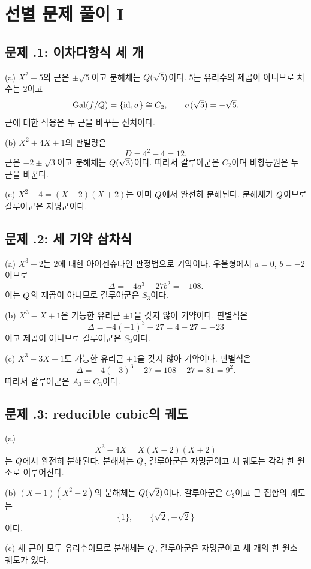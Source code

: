 \section{선별 문제 풀이 I}
\label{sec:equation-groups-solutions-a}

\subsection*{문제 \thechapter.1: 이차다항식 세 개}

\begin{solution}
(a) $X^2-5$의 근은 $\pm\sqrt5$이고 분해체는 $Q(\sqrt5)$이다. $5$는 유리수의 제곱이 아니므로 차수는 $2$이고
\[
  \operatorname{Gal}(f/Q)=\{\operatorname{id},\sigma\}\cong C_2,
  \qquad
  \sigma(\sqrt5)=-\sqrt5.
\]
근에 대한 작용은 두 근을 바꾸는 전치이다.

(b) $X^2+4X+1$의 판별량은
\[
  D=4^2-4=12.
\]
근은 $-2\pm\sqrt3$이고 분해체는 $Q(\sqrt3)$이다. 따라서 갈루아군은 $C_2$이며 비항등원은 두 근을 바꾼다.

(c) $X^2-4=(X-2)(X+2)$는 이미 $Q$에서 완전히 분해된다. 분해체가 $Q$이므로 갈루아군은 자명군이다.
\end{solution}

\subsection*{문제 \thechapter.2: 세 기약 삼차식}

\begin{solution}
(a) $X^3-2$는 $2$에 대한 아이젠슈타인 판정법으로 기약이다. 우울형에서 $a=0$, $b=-2$이므로
\[
  \Delta=-4a^3-27b^2=-108.
\]
이는 $Q$의 제곱이 아니므로 갈루아군은 $S_3$이다.

(b) $X^3-X+1$은 가능한 유리근 $\pm1$을 갖지 않아 기약이다. 판별식은
\[
  \Delta=-4(-1)^3-27=4-27=-23
\]
이고 제곱이 아니므로 갈루아군은 $S_3$이다.

(c) $X^3-3X+1$도 가능한 유리근 $\pm1$을 갖지 않아 기약이다. 판별식은
\[
  \Delta=-4(-3)^3-27=108-27=81=9^2.
\]
따라서 갈루아군은 $A_3\cong C_3$이다.
\end{solution}

\subsection*{문제 \thechapter.3: reducible cubic의 궤도}

\begin{solution}
(a)
\[
  X^3-4X=X(X-2)(X+2)
\]
는 $Q$에서 완전히 분해된다. 분해체는 $Q$, 갈루아군은 자명군이고 세 궤도는 각각 한 원소로 이루어진다.

(b) $(X-1)(X^2-2)$의 분해체는 $Q(\sqrt2)$이다. 갈루아군은 $C_2$이고 근 집합의 궤도는
\[
  \{1\},
  \qquad
  \{\sqrt2,-\sqrt2\}
\]
이다.

(c) 세 근이 모두 유리수이므로 분해체는 $Q$, 갈루아군은 자명군이고 세 개의 한 원소 궤도가 있다.
\end{solution}

